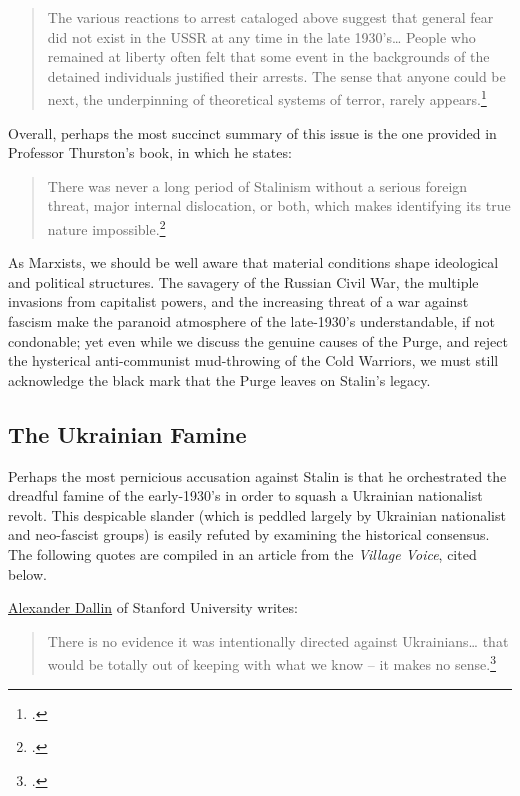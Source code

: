 \begin{quote}
The various reactions to arrest cataloged above suggest that general
fear did not exist in the USSR at any time in the late 1930's\ldots{}
People who remained at liberty often felt that some event in the
backgrounds of the detained individuals justified their arrests. The
sense that anyone could be next, the underpinning of theoretical systems
of terror, rarely appears.\footcite{thurston1986fear}
\end{quote}

Overall, perhaps the most succinct summary of this issue is the one
provided in Professor Thurston's book, in which he states:

\begin{quote}
There was never a long period of Stalinism without a serious foreign
threat, major internal dislocation, or both, which makes identifying its
true nature impossible.\footcite{thurston1998life}
\end{quote}

As Marxists, we should be well aware that material conditions shape
ideological and political structures. The savagery of the Russian Civil
War, the multiple invasions from capitalist powers, and the increasing
threat of a war against fascism make the paranoid atmosphere of the
late-1930's understandable, if not condonable; yet even while we discuss
the genuine causes of the Purge, and reject the hysterical
anti-communist mud-throwing of the Cold Warriors, we must still
acknowledge the black mark that the Purge leaves on Stalin's legacy.

\subsection*{The Ukrainian Famine}

Perhaps the most pernicious accusation against Stalin is that he
orchestrated the dreadful famine of the early-1930's in order to squash
a Ukrainian nationalist revolt. This despicable slander (which is
peddled largely by Ukrainian nationalist and neo-fascist groups) is
easily refuted by examining the historical consensus. The following
quotes are compiled in an article from the \emph{Village Voice}, cited
below.

\href{https://creees.stanford.edu/events/alexander-dallin-lecture-russian-east-european-and-eurasian-affairs}{Alexander
Dallin} of Stanford University writes:

\begin{quote}
There is no evidence it was intentionally directed against
Ukrainians\ldots{} that would be totally out of keeping with what we
know -- it makes no sense.\footcite{coplon1988search}
\end{quote}

